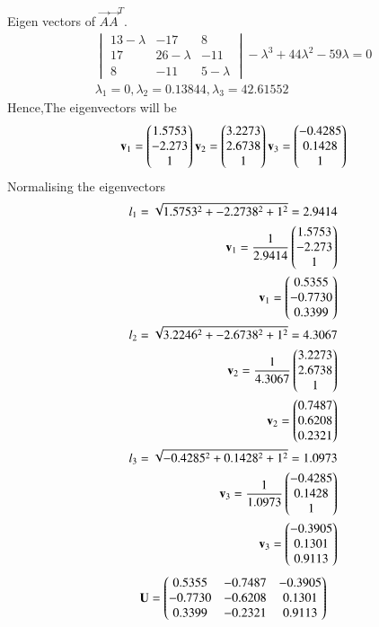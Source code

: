 \documentclass[journal,12pt,twocolumn]{IEEEtran}
\begin{document}
Eigen vectors of $\vec{A}$$\vec{A}^T.$
\begin{align}
\begin{vmatrix}
13-\lambda&-17&8\\17&26-\lambda&-11\\8&-11&5-\lambda
\end{vmatrix}
-\lambda^3+44\lambda^2-59\lambda=0\\
\lambda_1=0,\lambda_2=0.13844,\lambda_3=42.61552
\end{align}
Hence,The eigenvectors will be
\begin{align}
\mathbf{v}_1=\begin{pmatrix}1.5753\\-2.273\\1\end{pmatrix}
\mathbf{v}_2=\begin{pmatrix}3.2273\\2.6738\\1\end{pmatrix}
\mathbf{v}_3=\begin{pmatrix}-0.4285\\0.1428\\1\end{pmatrix}
\end{align}
Normalising the eigenvectors
\begin{align}
l_1=\sqrt{1.5753^2+-2.2738^2+1^2}=2.9414\\
\mathbf{v}_1=\frac{1}{2.9414}\begin{pmatrix}1.5753\\-2.273\\1\end{pmatrix}\\
\mathbf{v}_1=\begin{pmatrix}0.5355\\-0.7730\\0.3399\end{pmatrix}\\
l_2=\sqrt{3.2246^2+-2.6738^2+1^2}=4.3067\\
\mathbf{v}_2=\frac{1}{4.3067}\begin{pmatrix}3.2273\\2.6738\\1\end{pmatrix}\\
\mathbf{v}_2=\begin{pmatrix}0.7487\\0.6208\\0.2321\end{pmatrix}\\
l_3=\sqrt{-0.4285^2+0.1428^2+1^2}=1.0973\\
\mathbf{v}_3=\frac{1}{1.0973}\begin{pmatrix}-0.4285\\0.1428\\1\end{pmatrix}\\
\mathbf{v}_3=\begin{pmatrix}-0.3905\\0.1301\\0.9113\end{pmatrix}
\end{align}
\begin{align}
\mathbf{U}=\begin{pmatrix}0.5355&-0.7487&-0.3905\\-0.7730&-0.6208&0.1301\\0.3399&-0.2321&0.9113\end{pmatrix}
\end{align}
$$
\end{document}
